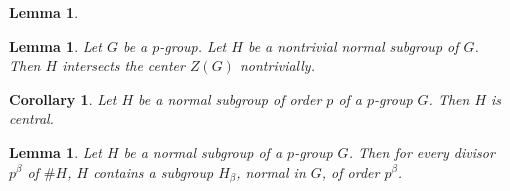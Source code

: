 \documentclass{dcthesis}
\numberwithin{equation}{section}
\newtheorem{lemma}[equation]{Lemma}
\newtheorem{corr}[equation]{Corollary}
\theoremstyle{definition}
\theoremstyle{remark}
\begin{document}
{{{\begin{lemma}
    \end{lemma}
    \begin{lemma}
      \label{lem:normalimpliescentralintersect}
      Let $G$ be a $p$-group.
      Let $H$ be a nontrivial normal subgroup of $G$.
      Then $H$ intersects the center $Z(G)$ nontrivially.
    \end{lemma}
    \begin{corr}
      \label{cor:normalcentral}
      Let $H$ be a normal subgroup of order $p$ of a $p$-group $G$.
      Then $H$ is central.
    \end{corr}
    \begin{lemma}
      \label{lem:normalsubgroupsofallorders}
      Let $H$ be a normal subgroup of a $p$-group $G$.
      Then for every divisor $p^\beta$ of $\# H$,
      $H$ contains a subgroup $H_\beta$,
      normal in $G$, of order $p^\beta$.

\end{lemma}}}}
\end{document}
